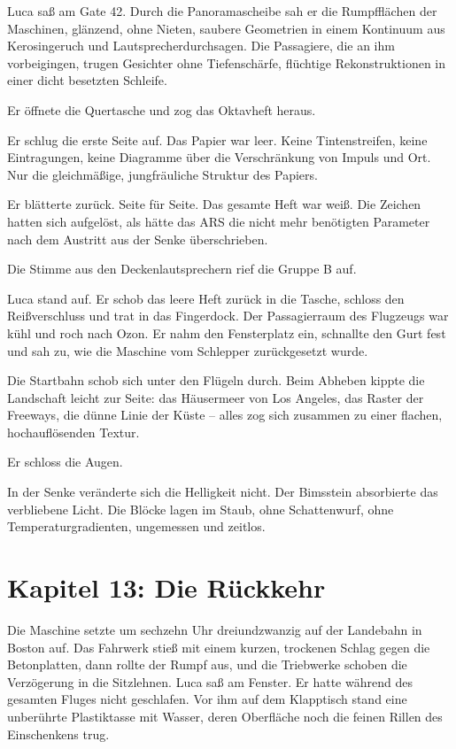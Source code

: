 \documentclass[
  ngerman,
]{article}
\begin{document}
Luca saß am Gate 42. Durch die Panoramascheibe sah er die Rumpfflächen
der Maschinen, glänzend, ohne Nieten, saubere Geometrien in einem
Kontinuum aus Kerosingeruch und Lautsprecherdurchsagen. Die Passagiere,
die an ihm vorbeigingen, trugen Gesichter ohne Tiefenschärfe, flüchtige
Rekonstruktionen in einer dicht besetzten Schleife.

Er öffnete die Quertasche und zog das Oktavheft heraus.

Er schlug die erste Seite auf. Das Papier war leer. Keine
Tintenstreifen, keine Eintragungen, keine Diagramme über die
Verschränkung von Impuls und Ort. Nur die gleichmäßige, jungfräuliche
Struktur des Papiers.

Er blätterte zurück. Seite für Seite. Das gesamte Heft war weiß. Die
Zeichen hatten sich aufgelöst, als hätte das ARS die nicht mehr
benötigten Parameter nach dem Austritt aus der Senke überschrieben.

Die Stimme aus den Deckenlautsprechern rief die Gruppe B auf.

Luca stand auf. Er schob das leere Heft zurück in die Tasche, schloss
den Reißverschluss und trat in das Fingerdock. Der Passagierraum des
Flugzeugs war kühl und roch nach Ozon. Er nahm den Fensterplatz ein,
schnallte den Gurt fest und sah zu, wie die Maschine vom Schlepper
zurückgesetzt wurde.

Die Startbahn schob sich unter den Flügeln durch. Beim Abheben kippte
die Landschaft leicht zur Seite: das Häusermeer von Los Angeles, das
Raster der Freeways, die dünne Linie der Küste -- alles zog sich
zusammen zu einer flachen, hochauflösenden Textur.

Er schloss die Augen.

In der Senke veränderte sich die Helligkeit nicht. Der Bimsstein
absorbierte das verbliebene Licht. Die Blöcke lagen im Staub, ohne
Schattenwurf, ohne Temperaturgradienten, ungemessen und zeitlos.

\section{}\label{section-6}

\section{Kapitel 13: Die Rückkehr}\label{kapitel-13-die-ruxfcckkehr}

Die Maschine setzte um sechzehn Uhr dreiundzwanzig auf der Landebahn in
Boston auf. Das Fahrwerk stieß mit einem kurzen, trockenen Schlag gegen
die Betonplatten, dann rollte der Rumpf aus, und die Triebwerke schoben
die Verzögerung in die Sitzlehnen. Luca saß am Fenster. Er hatte während
des gesamten Fluges nicht geschlafen. Vor ihm auf dem Klapptisch stand
eine unberührte Plastiktasse mit Wasser, deren Oberfläche noch die
feinen Rillen des Einschenkens trug.
\end{document}
